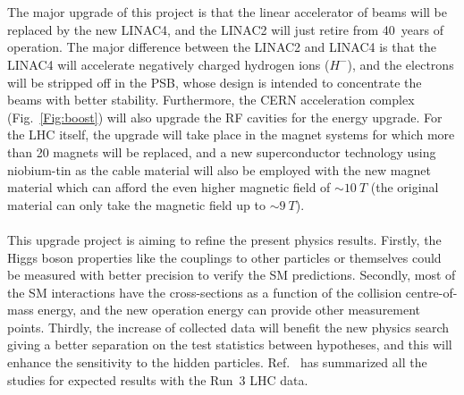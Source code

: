\noindent
\\
\\The major upgrade of this project is that the linear accelerator of beams will be replaced by the new LINAC4, and the LINAC2 will just retire from 40~years of operation. The major difference between the LINAC2 and LINAC4 is that the LINAC4 will accelerate negatively charged hydrogen ions ($H^{-}$), and the electrons will be stripped off in the PSB, whose design is intended to concentrate the beams with better stability\cite{LINAC4}. Furthermore, the CERN acceleration complex (Fig.~\ref{Fig:boost}) will also upgrade the RF cavities for the energy upgrade. For the LHC itself, the upgrade will take place in the magnet systems for which more than 20 magnets will be replaced, and a new superconductor technology using niobium-tin as the cable material will also be employed with the new magnet material which can afford the even higher magnetic field of $\sim 10~T$ (the original material can only take the magnetic field up to $\sim 9~T$)\cite{LINAC4}. 
\\
\\This upgrade project is aiming to refine the present physics results. Firstly, the Higgs boson properties like the couplings to other particles or themselves could be measured with better precision to verify the SM predictions. Secondly, most of the SM interactions have the cross-sections as a function of the collision centre-of-mass energy, and the new operation energy can provide other measurement points. Thirdly, the increase of collected data will benefit the new physics search giving a better separation on the test statistics between hypotheses, and this will enhance the sensitivity to the hidden particles. Ref.~\cite{Atlas:2019qfx} has summarized all the studies for expected results with the Run~3 LHC data.

